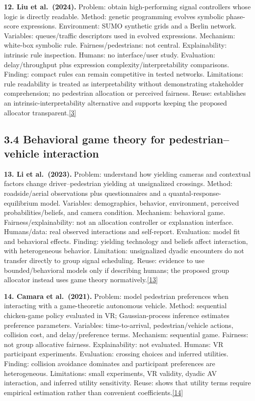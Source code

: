 \documentclass[
  english,
  11pt,
  a4paper,
]{article}
\begin{document}
\textbf{12. Liu et al.~(2024).} Problem: obtain high-performing signal
controllers whose logic is directly readable. Method: genetic
programming evolves symbolic phase-score expressions. Environment: SUMO
synthetic grids and a Berlin network. Variables: queues/traffic
descriptors used in evolved expressions. Mechanism: white-box symbolic
rule. Fairness/pedestrians: not central. Explainability: intrinsic rule
inspection. Humans: no interface/user study. Evaluation:
delay/throughput plus expression complexity/interpretability
comparisons. Finding: compact rules can remain competitive in tested
networks. Limitations: rule readability is treated as interpretability
without demonstrating stakeholder comprehension; no pedestrian
allocation or perceived fairness. Reuse: establishes an
intrinsic-interpretability alternative and supports keeping the proposed
allocator transparent.\hyperref[source-3]{[3]}

\subsection{3.4 Behavioral game theory for pedestrian--vehicle
interaction}\label{behavioral-game-theory-for-pedestrianvehicle-interaction}

\textbf{13. Li et al.~(2023).} Problem: understand how yielding cameras
and contextual factors change driver--pedestrian yielding at
unsignalized crossings. Method: roadside/aerial observations plus
questionnaires and a quantal-response-equilibrium model. Variables:
demographics, behavior, environment, perceived probabilities/beliefs,
and camera condition. Mechanism: behavioral game.
Fairness/explainability: not an allocation controller or explanation
interface. Humans/data: real observed interactions and self-report.
Evaluation: model fit and behavioral effects. Finding: yielding
technology and beliefs affect interaction, with heterogeneous behavior.
Limitation: unsignalized dyadic encounters do not transfer directly to
group signal scheduling. Reuse: evidence to use bounded/behavioral
models only if describing humans; the proposed group allocator instead
uses game theory normatively.\hyperref[source-13]{[13]}

\textbf{14. Camara et al.~(2021).} Problem: model pedestrian preferences
when interacting with a game-theoretic autonomous vehicle. Method:
sequential chicken-game policy evaluated in VR; Gaussian-process
inference estimates preference parameters. Variables: time-to-arrival,
pedestrian/vehicle actions, collision cost, and delay/preference terms.
Mechanism: sequential game. Fairness: not group allocative fairness.
Explainability: not evaluated. Humans: VR participant experiments.
Evaluation: crossing choices and inferred utilities. Finding: collision
avoidance dominates and participant preferences are heterogeneous.
Limitations: small experiments, VR validity, dyadic AV interaction, and
inferred utility sensitivity. Reuse: shows that utility terms require
empirical estimation rather than convenient
coefficients.\hyperref[source-14]{[14]}
\end{document}
